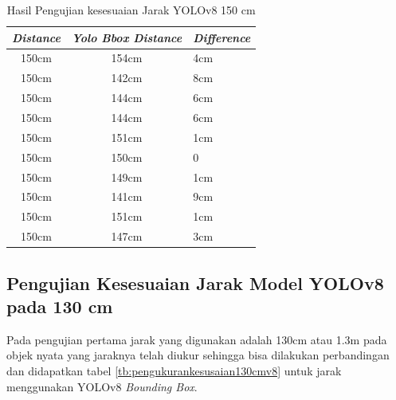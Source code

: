     \begin{table}[H]
      \centering
      \caption{Hasil Pengujian kesesuaian Jarak YOLOv8 150 cm}
      \label{tb:pengukurankesusaian150cmv8}
      \begin{tabular}{|c|c|l|}
        \hline
        \textit{Distance} & \textit{Yolo Bbox Distance} & \textit{Difference} \\ \hline
        150cm             & 154cm                       & 4cm                 \\ \hline
        150cm             & 142cm                       & 8cm                 \\ \hline
        150cm             & 144cm                       & 6cm                 \\ \hline
        150cm             & 144cm                       & 6cm                 \\ \hline
        150cm             & 151cm                       & 1cm                 \\ \hline
        150cm             & 150cm                       & 0                   \\ \hline
        150cm             & 149cm                       & 1cm                 \\ \hline
        150cm             & 141cm                       & 9cm                 \\ \hline
        150cm             & 151cm                       & 1cm                 \\ \hline
        150cm             & 147cm                       & 3cm                 \\ \hline
        \end{tabular}
      \end{table}
    
\subsection{Pengujian Kesesuaian Jarak Model YOLOv8 pada 130 cm}
    
Pada pengujian pertama jarak yang digunakan adalah 130cm atau 1.3m pada objek nyata yang jaraknya telah diukur sehingga bisa dilakukan perbandingan dan didapatkan tabel \ref{tb:pengukurankesusaian130cmv8} untuk jarak menggunakan YOLOv8 \emph{Bounding Box}.
      
